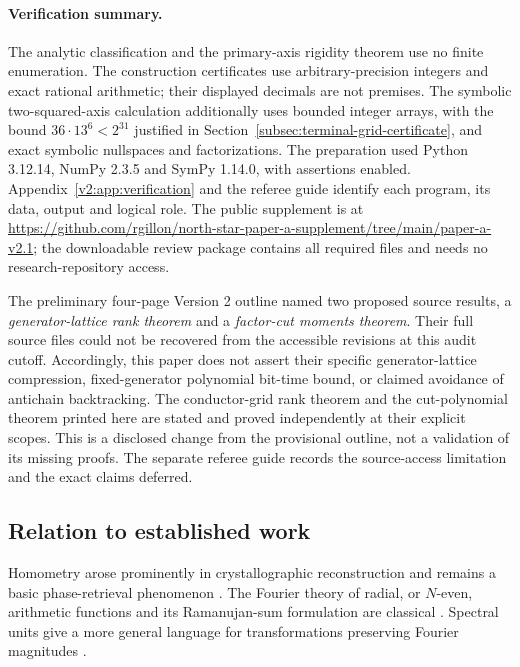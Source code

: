 \paragraph{Verification summary.}
The analytic classification and the primary-axis rigidity theorem use no finite enumeration. The construction certificates use arbitrary-precision integers and exact rational arithmetic; their displayed decimals are not premises. The symbolic two-squared-axis calculation additionally uses bounded integer arrays, with the bound $36\cdot13^6<2^{31}$ justified in Section~\ref{subsec:terminal-grid-certificate}, and exact symbolic nullspaces and factorizations. The preparation used Python 3.12.14, NumPy 2.3.5 and SymPy 1.14.0, with assertions enabled. Appendix~\ref{v2:app:verification} and the referee guide identify each program, its data, output and logical role. The public supplement is at \url{https://github.com/rgillon/north-star-paper-a-supplement/tree/main/paper-a-v2.1}; the downloadable review package contains all required files and needs no research-repository access.

The preliminary four-page Version 2 outline named two proposed source results, a \emph{generator-lattice rank theorem} and a \emph{factor-cut moments theorem}. Their full source files could not be recovered from the accessible revisions at this audit cutoff. Accordingly, this paper does not assert their specific generator-lattice compression, fixed-generator polynomial bit-time bound, or claimed avoidance of antichain backtracking. The conductor-grid rank theorem and the cut-polynomial theorem printed here are stated and proved independently at their explicit scopes. This is a disclosed change from the provisional outline, not a validation of its missing proofs. The separate referee guide records the source-access limitation and the exact claims deferred.

\subsection{Relation to established work}
Homometry arose prominently in crystallographic reconstruction and remains a basic phase-retrieval phenomenon \cite{Patterson1944,RosenblattSeymour1982,BendoryEdidinGonzalez2023}. The Fourier theory of radial, or $N$-even, arithmetic functions and its Ramanujan-sum formulation are classical \cite{TothHaukkanen2011}. Spectral units give a more general language for transformations preserving Fourier magnitudes \cite{Rosenblatt1984,Amiot2009}.


